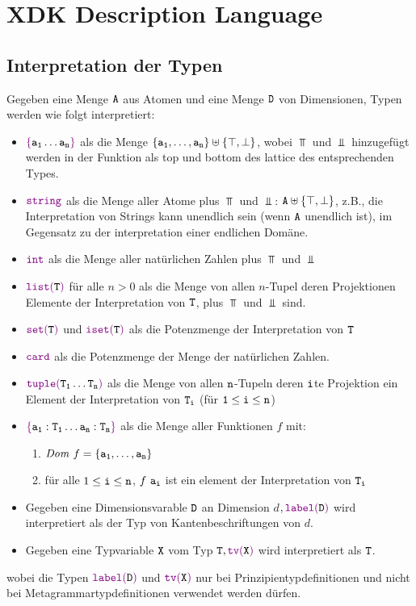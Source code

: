 \chapter{XDK Description Language}
\section{Interpretation der Typen}\label{dltypesdef}
  Gegeben eine Menge $\mathtt{A}$ aus Atomen und eine Menge $\mathtt{D}$ von
  Dimensionen, Typen werden wie folgt interpretiert:
  \begin{itemize}
  \item $\Ulp{\{}\Ulb{a_1\ldots a_n}\Ulp{\}}$ als die Menge
    $\{\mathtt{a_1},\ldots,\mathtt{a_n}\}\uplus\{\top,\bot\}$, wobei $\Top$
    und $\Bot$ hinzugef\"ugt werden in der Funktion als top und bottom
    des lattice des entsprechenden Types.
  \item $\Ulp{string}$ als die Menge aller Atome plus  $\Top$ und $\Bot$:
    $\mathtt{A}\uplus\{\top,\bot\}$, z.B., die Interpretation von Strings
    kann unendlich sein (wenn $\mathtt{A}$ unendlich ist), im Gegensatz
    zu der interpretation einer endlichen Dom\"ane.
  \item $\Ulp{int}$ als die Menge aller nat\"urlichen Zahlen plus $\Top$ und $\Bot$
  \item $\Ulp{list(}\Ulb{T}\Ulp{)}$ f\"ur alle $n>0$ als die Menge von
    allen $n$-Tupel deren Projektionen Elemente der Interpretation von
    $\mathtt{T}$, plus $\Top$ und $\Bot$ sind.
  \item $\Ulp{set(}\Ulb{T}\Ulp{)}$ und $\Ulp{iset(}\Ulb{T}\Ulp{)}$ als
    die Potenzmenge der Interpretation von $\mathtt{T}$
  \item $\Ulp{card}$ als die Potenzmenge der Menge der nat\"urlichen Zahlen.
  \item $\Ulp{tuple(}\Ulb{T_1\ldots T_n}\Ulp{)}$ als die Menge von
    allen $\mathtt{n}$-Tupeln deren $\mathtt{i}$te Projektion ein Element
    der Interpretation von $\mathtt{T_i}$ (f\"ur $\mathtt{1\leq i\leq n}$)
  \item $\Ulp{\{}\Ulb{a_1:T_1\ldots a_n:T_n}\Ulp{\}}$ als die Menge
    aller Funktionen  $f$ mit:
    \begin{enumerate}
    \item $\mathit{Dom}\ f=\{\Ulb{a_1},\ldots,\Ulb{a_n}\}$
    \item f\"ur alle $1\leq\mathtt{i}\leq\mathtt{n}$, $f\ \mathtt{a_i}$ ist ein
      element der Interpretation von $\mathtt{T_i}$
    \end{enumerate}
  \item Gegeben eine Dimensionsvarable $\mathtt{D}$ an Dimension $d$$,
    \Ulp{label(}\Ulb{D}\Ulp{)}$ wird interpretiert als der Typ von
    Kantenbeschriftungen von  $d$.
  \item Gegeben eine Typvariable $\mathtt{X}$ vom Typ $\mathtt{T},
    $$\Ulp{tv(}\Ulb{X}\Ulp{)}$ wird interpretiert als $\mathtt{T}$.
  \end{itemize}
  wobei die Typen $\Ulp{label(}\Ulb{D}\Ulp{)}$ und $\Ulp{tv(}\Ulb{X}\Ulp{)}$
  nur bei Prinzipientypdefinitionen und nicht bei
  Metagrammartypdefinitionen verwendet werden d\"urfen.


